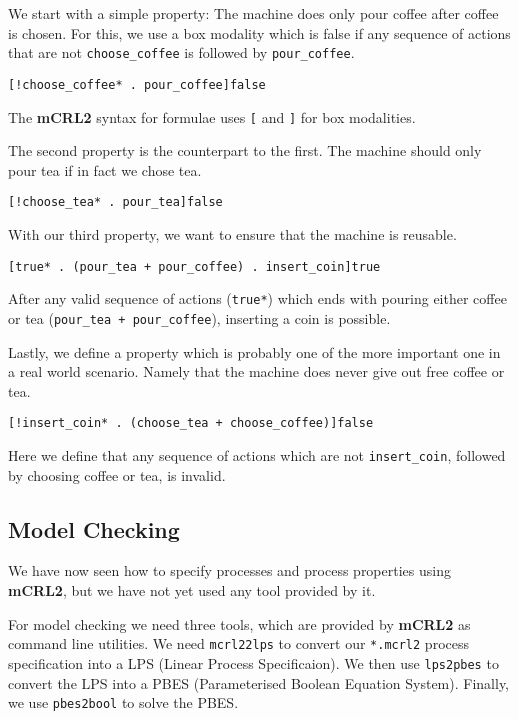 \documentclass{clseminar}
\begin{document}
  We start with a simple property: The machine does only pour coffee after coffee is chosen. For this, we use a box modality which is false if any sequence of actions that are not \texttt{choose\_coffee} is followed by \texttt{pour\_coffee}.

  \begin{lstlisting}[language=mCRL2]
[!choose_coffee* . pour_coffee]false
  \end{lstlisting}

  The \textbf{mCRL2} syntax for formulae uses \texttt{[} and \texttt{]} for box modalities.

  The second property is the counterpart to the first. The machine should only pour tea if in fact we chose tea.

  \begin{lstlisting}[language=mCRL2]
[!choose_tea* . pour_tea]false
  \end{lstlisting}

  With our third property, we want to ensure that the machine is reusable.

  \begin{lstlisting}[language=mCRL2]
[true* . (pour_tea + pour_coffee) . insert_coin]true
  \end{lstlisting}

  After any valid sequence of actions (\texttt{true*}) which ends with pouring either coffee or tea (\texttt{pour\_tea + pour\_coffee}), inserting a coin is possible.

  Lastly, we define a property which is probably one of the more important one in a real world scenario. Namely that the machine does never give out free coffee or tea.

  \begin{lstlisting}[language=mCRL2]
[!insert_coin* . (choose_tea + choose_coffee)]false
  \end{lstlisting}

  Here we define that any sequence of actions which are not \texttt{insert\_coin}, followed by choosing coffee or tea, is invalid.

  \subsection{Model Checking}

  We have now seen how to specify processes and process properties using \textbf{mCRL2}, but we have not yet used any tool provided by it.

  For model checking we need three tools, which are provided by \textbf{mCRL2} as command line utilities. We need \texttt{mcrl22lps} to convert our \texttt{*.mcrl2} process specification into a LPS (Linear Process Specificaion). We then use \texttt{lps2pbes} to convert the LPS into a PBES (Parameterised Boolean Equation System). Finally, we use \texttt{pbes2bool} to solve the PBES.
\end{document}
